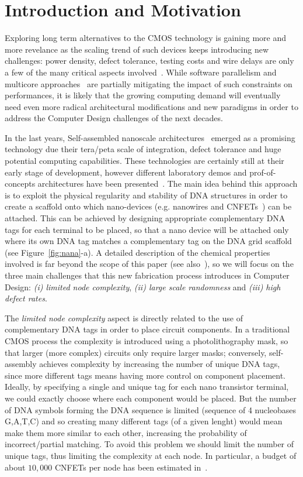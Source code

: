 
\section{Introduction and Motivation}

Exploring long term alternatives to the CMOS technology is gaining
more and more revelance as the scaling trend of such devices keeps
introducing new challenges: power density, defect tolerance, testing
costs and wire delays are only a few of the many critical aspects
involved~\cite{itrs13}. 
While software parallelism and multicore
approaches~\cite{horowitz2004, powell2009} are partially mitigating the impact of such
constraints on performances, it is likely that the growing computing demand will
eventually need even more radical architectural modifications and new
paradigms in order to address the Computer Design challenges of the next
decades.

In the last years, Self-assembled nanoscale architectures~\cite{yan2003}
emerged as a promising technology due their tera/peta scale of
integration, defect tolerance and huge potential computing
capabilities. These technologies are certainly still at
their early stage of development, however different laboratory demos and
prof-of-concepts architectures have been presented~\cite{patwardhan2004, patwardhan2006_1, pistol2009}.
The main idea behind this approach is to exploit the physical regularity and
stability of DNA structures in order to create a scaffold onto which
nano-devices (e.g. nanowires and CNFETs~\cite{bachtold2001, tans1998, cui2001}) can be
attached. This can be achieved by designing appropriate complementary DNA tags for
each terminal to be placed, so that a nano device will be attached
only where its own DNA tag matches a complementary tag on the DNA grid
scaffold (see Figure~\ref{fig:nana}-a).
A detailed description of the chemical properties involved is far
beyond the scope of this paper (see also~\cite{braun1998, seeman1999}), so we will focus on
the three main challenges that this new fabrication process introduces
in Computer Design: \emph{(i) limited node complexity}, \emph{(ii) large scale
randomness} and \emph{(iii) high defect rates}.  

The \emph{limited node complexity} aspect is directly
related to the use of complementary DNA tags in order to place circuit
components. In a traditional CMOS process the complexity is introduced
using a photolithography mask, so that larger (more complex) circuits
only require larger masks; conversely, self-assembly achieves
complexity by increasing the number of unique DNA tags, since more
different tags means having more control on component placement. Ideally, by specifying a single
and unique tag for each nano transistor terminal, we could exactly
choose where each component would be placed. But the number of DNA
symbols forming the DNA sequence is limited (sequence of 4 nucleobases
G,A,T,C) and so creating many different tags (of a given lenght) would
mean make them more similar to each other, increasing the probability
of incorrect/partial matching. To avoid this problem we should limit
the number of unique tags, thus limiting the complexity at each node.
In particular, a budget of about $10,000$ CNFETs per node has been
estimated in~\cite{liu_jetcs}.

